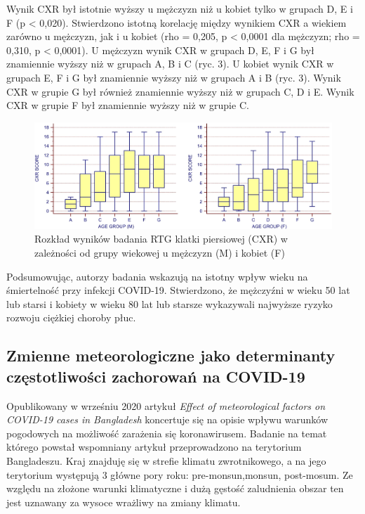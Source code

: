 \documentclass[polish, twoside, 12pt, a4paper]{article}
\theoremstyle{definition}
\theoremstyle{plain}
\theoremstyle{remark}
\begin{document}
Wynik CXR był istotnie wyższy u mężczyzn niż u kobiet tylko w grupach D, E i F (p < 0,020). Stwierdzono istotną korelację między wynikiem CXR a wiekiem zarówno u mężczyzn, jak i u kobiet (rho = 0,205, p < 0,0001 dla mężczyzn; rho = 0,310, p < 0,0001). U mężczyzn wynik CXR w grupach D, E, F i G był znamiennie wyższy niż w grupach A, B i C (ryc. 3). U kobiet wynik CXR w grupach E, F i G był znamiennie wyższy niż w grupach A i B (ryc. 3). Wynik CXR w grupie G był również znamiennie wyższy niż w grupach C, D i E. Wynik CXR w grupie F był znamiennie wyższy niż w grupie C.

\begin{figure}[h]
\centering
\includegraphics[width=15cm]{age-sex.jpg}
\caption{Rozkład wyników badania RTG klatki piersiowej (CXR) w zależności od grupy wiekowej u mężczyzn (M) i kobiet (F)}
\end{figure}

Podsumowując, autorzy badania wskazują na istotny wpływ wieku na śmiertelność przy infekcji COVID-19. Stwierdzono, że mężczyźni w wieku 50 lat lub starsi i kobiety w wieku 80 lat lub starsze wykazywali najwyższe ryzyko rozwoju ciężkiej choroby płuc. \cite{wang2020}

\subsection{Zmienne meteorologiczne jako determinanty częstotliwości zachorowań na COVID-19}

Opublikowany w wrześniu 2020 artykuł \emph{Effect of meteorological factors on COVID-19 cases in Bangladesh} koncertuje się na opisie wpływu warunków pogodowych na możliwość zarażenia się koronawirusem. Badanie na temat którego powstał wspomniany artykuł przeprowadzono na terytorium Bangladeszu. Kraj znajduję się w strefie klimatu zwrotnikowego, a na jego terytorium występują 3 główne pory roku: pre-monsun,monsun, post-mosum. Ze względu na złożone warunki klimatyczne i dużą gęstość zaludnienia obszar ten jest uznawany za wysoce wrażliwy na zmiany klimatu.
\end{document}

